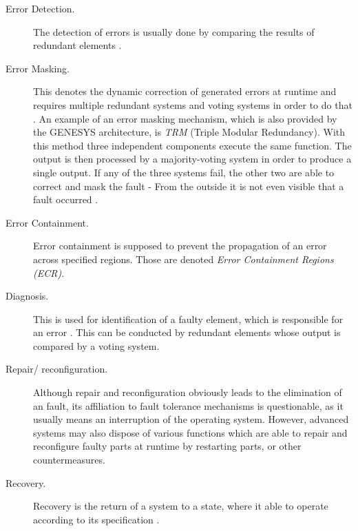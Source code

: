 \begin{description}
\item [Error Detection.] The detection of errors is usually done by comparing the results of redundant elements \cite{nelson}.
\item [Error Masking.] This denotes the dynamic correction of generated errors at runtime and requires multiple redundant systems and voting systems in order to do that \cite{nelson}. An example of an error masking mechanism, which is also provided by the GENESYS architecture, is \emph{TRM} (Triple Modular Redundancy). With this method three independent components execute the same function. The output is then processed by a majority-voting system in order to produce a single output. If any of the three systems fail, the other two are able to correct and mask the fault - From the outside it is not even visible that a fault occurred \cite{wiki_tmr}.
\item [Error Containment.] Error containment is supposed to prevent the propagation of an error across specified regions. Those are denoted \emph{Error Containment Regions (ECR)}.
\item [Diagnosis.] This is used for identification of a faulty element, which is responsible for an error \cite{nelson}. This can be conducted by redundant elements whose output is compared by a voting system.
\item [Repair/ reconfiguration.] Although repair and reconfiguration obviously leads to the elimination of an fault, its affiliation to fault tolerance mechanisms is questionable, as it usually means an interruption of the operating system. However, advanced systems may also dispose of various functions which are able to repair and reconfigure faulty parts at runtime by restarting parts, or other countermeasures.
\item [Recovery.] Recovery is the return of a system to a state, where it able to operate according to its specification \cite{nelson}.
\end{description}